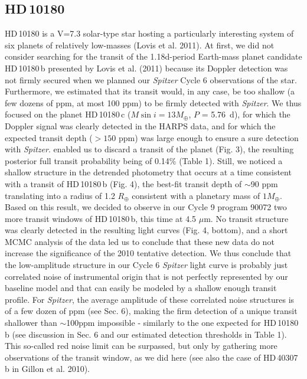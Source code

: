 \documentclass[traditabstract]{aa}
\begin{document}
\subsection{HD\,10180}

HD\,10180 is a V=7.3 solar-type star hosting a particularly interesting system of six planets of relatively low-masses (Lovis et al. 2011). At first, we did not consider searching for the transit of the 1.18d-period Earth-mass planet candidate HD\,10180\,b  presented by Lovis et al. (2011)  because its Doppler detection was not firmly secured when we planned our {\it Spitzer} Cycle 6 observations of the star. Furthermore,  we estimated that its  transit would, in any case, be too shallow (a few dozens of ppm, at most 100 ppm) to be firmly detected with {\it Spitzer}. We thus focused on the planet HD\,10180\,c ($M\sin{i} = 13 M_\oplus$, $P$ = 5.76~d), for which the Doppler signal was clearly detected in the HARPS data, and for which the expected transit depth ($> 150$ ppm) was large enough to ensure a sure detection with {\it Spitzer}. 
enabled us to discard a transit of the planet (Fig. 3), the resulting posterior full transit probability being of 0.14\% (Table 1). Still, we noticed a shallow structure in the detrended photometry that occurs at a time consistent with  a transit of HD\,10180\,b (Fig. 4), the best-fit transit depth of $\sim$90 ppm translating into a radius of 1.2 $R_\oplus$ consistent with a planetary mass of $1 M_\oplus$.  Based on this result, we decided to observe in our Cycle 9 program 90072 two more transit windows of HD\,10180\,b, this time at 4.5 $\mu$m. No transit structure was clearly detected in the resulting light curves (Fig. 4, bottom),  and a short MCMC analysis of the data led us to conclude that these new data do not  increase the significance of the 2010 tentative detection. We thus conclude that the low-amplitude  structure in our Cycle 6 {\it Spitzer} light curve is probably just correlated noise of instrumental origin that is not perfectly represented by our baseline model   and that can easily be modeled by a shallow enough transit profile. For {\it Spitzer}, the average amplitude of these correlated noise structures is of a few dozen of ppm (see Sec. 6), making the firm detection of a unique transit shallower than $\sim$100ppm  impossible  - similarly to the one expected for HD\,10180\,b (see discussion in Sec. 6 and our estimated detection thresholds in Table 1). This so-called red noise limit can  be surpassed, but only by gathering more observations of the transit window, as we did here (see also the case of HD\,40307\,b in Gillon et al. 2010).
\end{document}
